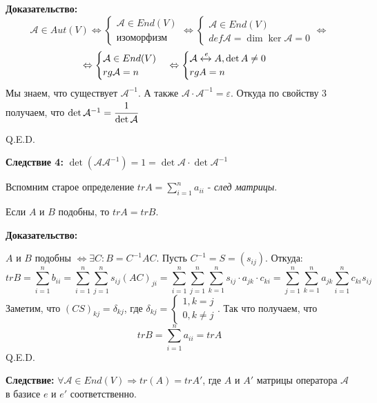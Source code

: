 \textbf{Доказательство:}
$$\mathcal{A} \in Aut(V) \Leftrightarrow \begin{cases}
    \mathcal{A} \in End(V) \\
    \text{изоморфизм}
\end{cases} \Leftrightarrow \begin{cases}
    \mathcal{A} \in End(V)\\
    def \mathcal{A} = \dim \ker \mathcal{A} = 0
\end{cases} \Leftrightarrow $$
$$\Leftrightarrow\begin{cases}
    \mathcal{A}\in End(V) \\
    rg \mathcal{A} = n
\end{cases} \Leftrightarrow \begin{cases}
    \mathcal{A} \xleftrightarrow{e} A,\det A \neq 0 \\
    rg A = n
\end{cases}$$
Мы знаем, что существует $\mathcal{A}^{-1}$. А также $\mathcal{A}\cdot \mathcal{A}^{-1}=\varepsilon$. Откуда по свойству 3 получаем, что $\det \mathcal{A}^{-1} = \cfrac{1}{\det \mathcal{A}}$

\hfill Q.E.D.

\textbf{Следствие 4:} $\det( \mathcal{A} \mathcal{A}^{-1})= 1 = \det  \mathcal{A} \cdot \det \mathcal{A}^{-1}$


Вспомним старое определение $tr A = \sum\limits_{i=1}^n a_{ii}$ - \emph{след матрицы}.


Если $A$ и $B$ подобны, то $tr A = tr B$.

\textbf{Доказательство:}

$A$ и $B$ подобны $\Leftrightarrow\exists C :B =C^{-1}AC$. Пусть $C^{-1} = S = (s_{ij})$. Откуда:
$$tr B = \sum\limits_{i=1}^n b_{ii} = \sum\limits_{i=1}^n \sum\limits_{j=1}^ns_{ij} (AC)_{ji} = \sum\limits_{i=1}^n \sum\limits_{j=1}^n \sum\limits_{k=1}^n s_{ij}\cdot a_{jk} \cdot c_{ki} = \sum\limits_{j=1}^n\sum\limits_{k=1}^n a_{jk}\sum\limits_{i=1}^nc_{ki}s_{ij}$$
Заметим, что $(CS)_{kj} = \delta_{kj}$, где $\delta_{kj}=\begin{cases}
    1, k=j\\
    0, k\neq j
\end{cases}$. Так что получаем, что
$$tr B = \sum\limits_{i=1}^n a_{ii} = tr A$$
\hfill Q.E.D.

\textbf{Следствие:} $\forall \mathcal{A} \in End(V) \Rightarrow tr(A) = tr A'$, где $A$ и $A'$ матрицы оператора $\mathcal{A}$ в базисе $e$ и $e'$ соответственно.

